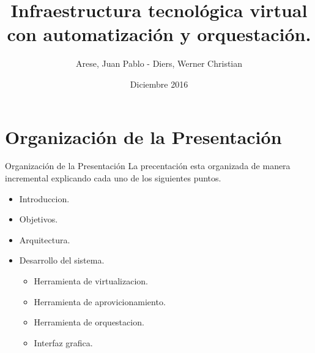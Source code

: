 \documentclass{beamer}
\title[Your Short Title]{Infraestructura tecnológica virtual con automatización y orquestación.}
\author{Arese, Juan Pablo - Diers, Werner Christian}
\institute{Facultad de Ciencias Exactas, Físicas y Naturales - UNC}
\date{Diciembre 2016}
\begin{document}
\begin{frame}
  \titlepage
\end{frame}


\section{Organización de la Presentación}

\begin{frame}{Organización de la Presentación}
\vspace{-1.5cm}
La precentación esta organizada de manera incremental explicando cada uno de los siguientes puntos.\\
\begin{itemize}
    \item Introduccion.
    \item Objetivos.
    \item Arquitectura.
    \item Desarrollo del sistema.
    \begin{itemize}
        \item Herramienta de virtualizacion.
        \item Herramienta de aprovicionamiento.
        \item Herramienta de orquestacion.
        \item Interfaz grafica.
    \end{itemize}
\end{itemize}

\end{frame}


\end{document}
